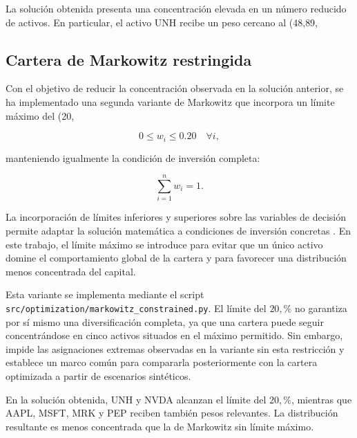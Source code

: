 La solución obtenida presenta una concentración elevada en un número reducido de activos. En particular, el activo UNH recibe un peso cercano al (48{,}89,%

\subsection{Cartera de Markowitz restringida}

Con el objetivo de reducir la concentración observada en la solución anterior, se ha implementado una segunda variante de Markowitz que incorpora un límite máximo del (20,%

\begin{equation}
0 \leq w_i \leq 0.20 \quad \forall i,
\end{equation}

manteniendo igualmente la condición de inversión completa:

\begin{equation}
\sum_{i=1}^{n} w_i = 1.
\end{equation}

La incorporación de límites inferiores y superiores sobre las variables de decisión permite adaptar la solución matemática a condiciones de inversión concretas \cite{boyd2004convex}. En este trabajo, el límite máximo se introduce para evitar que un único activo domine el comportamiento global de la cartera y para favorecer una distribución menos concentrada del capital.

Esta variante se implementa mediante el script \texttt{src/optimization/markowitz\_constrained.py}. El límite del \(20, \%\) no garantiza por sí mismo una diversificación completa, ya que una cartera puede seguir concentrándose en cinco activos situados en el máximo permitido. Sin embargo, impide las asignaciones extremas observadas en la variante sin esta restricción y establece un marco común para compararla posteriormente con la cartera optimizada a partir de escenarios sintéticos.

En la solución obtenida, UNH y NVDA alcanzan el límite del \(20,\%\), mientras que AAPL, MSFT, MRK y PEP reciben también pesos relevantes. La distribución resultante es menos concentrada que la de Markowitz sin límite máximo.

